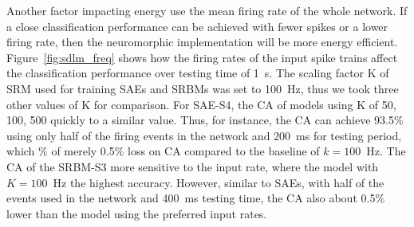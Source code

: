 \DIFaddend Another factor impacting energy use \DIFdelbegin {}\DIFdelend \DIFaddbegin {}\DIFaddend the mean firing rate of the whole network.
If a close classification performance can be achieved with fewer spikes or a lower firing rate, then the neuromorphic implementation will be more energy efficient.
Figure~\ref{fig:sdlm_freq} shows how the firing rates of the input spike trains affect the classification performance over \DIFaddbegin {}\DIFaddend testing time of 1~s.
The scaling factor K of SRM used for training SAEs and SRBMs was set to 100~Hz, thus we took three other values of K for comparison.
For SAE-S4, the CA of models using K of 50, 100, 500 \DIFdelbegin {}\DIFdelend \DIFaddbegin {}\DIFaddend quickly to a similar value.
Thus, for instance, the CA can achieve 93.5\% using only half of the firing events in the network and 200~ms for \DIFaddbegin {}\DIFaddend testing period, which \DIFdelbegin {}\DIFdelend \DIFaddbegin {}\% of \DIFdelbegin {}\DIFdelend \DIFaddbegin {}\DIFaddend merely 0.5\% loss on CA compared to the baseline of $k=100$~Hz.
The CA of the SRBM-S3 \DIFdelbegin {}\DIFdelend \DIFaddbegin {}\DIFaddend more sensitive to the input rate, where the model with $K=100$~Hz \DIFdelbegin {}\DIFdelend \DIFaddbegin {}\DIFaddend the highest accuracy.
However, similar to SAEs, with half of the events used in the network and 400~ms testing time, the CA \DIFdelbegin {}\DIFdelend \DIFaddbegin {}\DIFaddend also about 0.5\% lower than the model using the preferred input rates.

